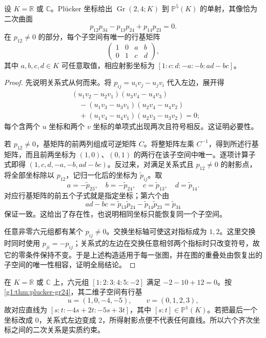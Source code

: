 \begin{theorem}\label{g1:thm:plucker-gr24}
	设 \(K=\mathbb R\) 或 \(\mathbb C\)。Plücker 坐标给出 \(\operatorname{Gr}(2,4;K)\) 到 \(\mathbb P^5(K)\) 的单射，其像恰为二次曲面
	\begin{equation}\label{g1:eq:plucker-gr24}
		p_{12}p_{34}-p_{13}p_{24}+p_{14}p_{23}=0.
	\end{equation}
	在 \(p_{12}\ne0\) 的部分，每个子空间有唯一的行基矩阵
	\[
		\begin{pmatrix}
			1&0&a&b\\
			0&1&c&d
		\end{pmatrix},
	\]
	其中 \(a,b,c,d\in K\) 可任意取值，相应射影坐标为 \([1:c:d:-a:-b:ad-bc]\)。
\end{theorem}
\begin{proof}
	先说明关系式从何而来。将 \(p_{ij}=u_i v_j-u_j v_i\) 代入左边，展开得
	\[
		\begin{aligned}
			&(u_1v_2-u_2v_1)(u_3v_4-u_4v_3)\\
			&\quad-(u_1v_3-u_3v_1)(u_2v_4-u_4v_2)\\
			&\quad+(u_1v_4-u_4v_1)(u_2v_3-u_3v_2)=0;
		\end{aligned}
	\]
	每个含两个 \(u\) 坐标和两个 \(v\) 坐标的单项式出现两次且符号相反。这证明必要性。

	若 \(p_{12}\ne0\)，基矩阵的前两列组成可逆矩阵 \(C\)。将整矩阵左乘 \(C^{-1}\)，得到所述行基矩阵，而且前两坐标为 \((1,0)\)、\((0,1)\) 的两行在该子空间中唯一。逐项计算子式即得 \((1,c,d,-a,-b,ad-bc)\)。反过来，对满足关系式且 \(p_{12}\ne0\) 的射影点，将全部坐标除以 \(p_{12}\)，记归一化后的坐标为 \(\widetilde p_{ij}\)。取
	\[
		a=-\widetilde p_{23},\quad b=-\widetilde p_{24},\quad
		c=\widetilde p_{13},\quad d=\widetilde p_{14}.
	\]
	对应行基矩阵的前五个子式就是指定坐标；第六个由
	\[
		ad-bc=\widetilde p_{13}\widetilde p_{24}
		-\widetilde p_{14}\widetilde p_{23}=\widetilde p_{34}
	\]
	保证一致。这给出了存在性，也说明相同坐标只能恢复同一个子空间。

	任意非零六元组都有某个 \(p_{ij}\ne0\)。交换坐标轴可使这对指标成为 \(1,2\)。这里交换时同时使用 \(p_{ji}=-p_{ij}\)；关系式的左边在交换任意相邻两个指标时只改变符号，故它的零条件保持不变。于是上述构造适用于每一张图，并在图的重叠处由恢复出的子空间的唯一性相容，证明全局结论。
\end{proof}

\begin{example}\label{g1:exm:plucker-reconstruction}
	在 \(K=\mathbb R\) 或 \(\mathbb C\) 上，六元组 \([1:2:3:4:5:-2]\) 满足 \(-2-10+12=0\)。按\cref{g1:thm:plucker-gr24}，其二维子空间有行基
	\[
		u=(1,0,-4,-5),\qquad v=(0,1,2,3),
	\]
	故对应直线为 \([s:t:-4s+2t:-5s+3t]\)，其中 \([s:t]\in\mathbb P^1(K)\)。若把最后一个坐标改成 \(0\)，关系式左边变成 \(2\)，所得射影点便不代表任何直线。所以六个齐次坐标之间的二次关系是实质约束。
\end{example}

